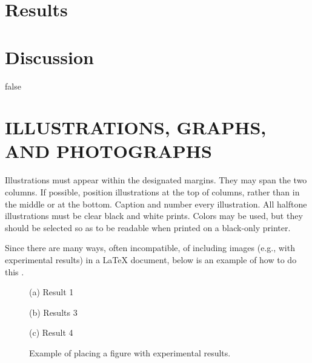 \documentclass{article}
\begin{document}
\section{Results}
\section{Discussion}

\if false
\section{ILLUSTRATIONS, GRAPHS, AND PHOTOGRAPHS}
\label{sec:illust}

Illustrations must appear within the designated margins.  They may span the two
columns.  If possible, position illustrations at the top of columns, rather
than in the middle or at the bottom.  Caption and number every illustration.
All halftone illustrations must be clear black and white prints.  Colors may be
used, but they should be selected so as to be readable when printed on a
black-only printer.

Since there are many ways, often incompatible, of including images (e.g., with
experimental results) in a LaTeX document, below is an example of how to do
this \cite{Lamp86}.

\begin{figure}[htb]

\begin{minipage}[b]{1.0\linewidth}
  \centering
  \centerline{(a) Result 1}\medskip
\end{minipage}
%
\begin{minipage}[b]{.48\linewidth}
  \centering
  \centerline{(b) Results 3}\medskip
\end{minipage}
\hfill
\begin{minipage}[b]{0.48\linewidth}
  \centering
  \centerline{(c) Result 4}\medskip
\end{minipage}
%
\caption{Example of placing a figure with experimental results.}
\label{fig:res}
%
\end{figure}
\end{document}
